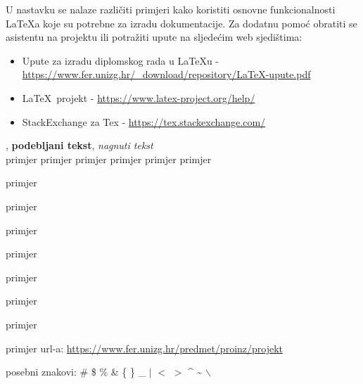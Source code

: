 		U nastavku se nalaze različiti primjeri kako koristiti osnovne funkcionalnosti \LaTeX a koje su potrebne za izradu dokumentacije. Za dodatnu pomoć obratiti se asistentu na projektu ili potražiti upute na sljedećim web sjedištima:
		\begin{itemize}
			\item Upute za izradu diplomskog rada u \LaTeX u - \url{https://www.fer.unizg.hr/_download/repository/LaTeX-upute.pdf}
			\item \LaTeX\ projekt - \url{https://www.latex-project.org/help/}
			\item StackExchange za Tex - \url{https://tex.stackexchange.com/}\\
		
		\end{itemize} 	


		
		\noindent {}, \textbf{podebljani tekst}, 	\textit{nagnuti tekst}\\
		\noindent \normalsize primjer \large primjer \Large primjer \LARGE {primjer} \huge {primjer} \Huge primjer \normalsize
				
		\begin{packed_item}
			
			\item  primjer
			\item  primjer
			\item  primjer
			\item[] \begin{packed_enum}
				\item primjer
				\item[] \begin{packed_enum}
					\item[1.a] primjer
					\item[b] primjer
				\end{packed_enum}
				\item primjer
			\end{packed_enum}
			
		\end{packed_item}
		
		\noindent primjer url-a: \url{https://www.fer.unizg.hr/predmet/proinz/projekt}
		
		\noindent posebni znakovi: \# \$ \% \& \{ \} \_ 
		$|$ $<$ $>$ 
		\^{} 
		\~{} 
		$\backslash$ 
		
